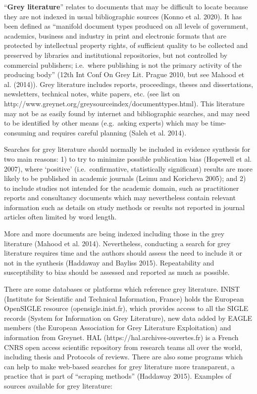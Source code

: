 \documentclass[
  letterpaper,
  DIV=11,
  numbers=noendperiod]{scrreprt}
\begin{document}
``\textbf{Grey literature}'' relates to documents that may be difficult
to locate because they are not indexed in usual bibliographic sources
(Konno et al. 2020). It has been defined as ``manifold document types
produced on all levels of government, academics, business and industry
in print and electronic formats that are protected by intellectual
property rights, of sufficient quality to be collected and preserved by
libraries and institutional repositories, but not controlled by
commercial publishers; i.e.~where publishing is not the primary activity
of the producing body'' (12th Int Conf On Grey Lit. Prague 2010, but see
Mahood et al. (2014)). Grey literature includes reports, proceedings,
theses and dissertations, newsletters, technical notes, white papers,
etc. (see list on
http://www.greynet.org/greysourceindex/documenttypes.html). This
literature may not be as easily found by internet and bibliographic
searches, and may need to be identified by other means (e.g.~asking
experts) which may be time-consuming and requires careful planning
(Saleh et al. 2014).

Searches for grey literature should normally be included in evidence
synthesis for two main reasons: 1) to try to minimize possible
publication bias (Hopewell et al. 2007), where `positive'
(i.e.~confirmative, statistically significant) results are more likely
to be published in academic journals (Leimu and Koricheva 2005); and 2)
to include studies not intended for the academic domain, such as
practitioner reports and consultancy documents which may nevertheless
contain relevant information such as details on study methods or results
not reported in journal articles often limited by word length.

More and more documents are being indexed including those in the grey
literature (Mahood et al. 2014). Nevertheless, conducting a search for
grey literature requires time and the authors should assess the need to
include it or not in the synthesis (Haddaway and Bayliss 2015).
Repeatability and susceptibility to bias should be assessed and reported
as much as possible.

There are some databases or platforms which reference grey literature.
INIST (Institute for Scientific and Technical Information, France) holds
the European OpenSIGLE resource (opensigle.inist.fr), which provides
access to all the SIGLE records (System for Information on Grey
Literature), new data added by EAGLE members (the European Association
for Grey Literature Exploitation) and information from Greynet. HAL
(https://hal.archives-ouvertes.fr) is a French CNRS open access
scientific repository from research teams all over the world, including
thesis and Protocols of reviews. There are also some programs which can
help to make web-based searches for grey literature more transparent, a
practice that is part of ``scraping methods'' (Haddaway 2015). Examples
of sources available for grey literature:
\end{document}
